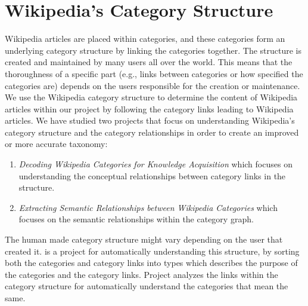 
\section{Wikipedia's Category Structure}
\label{sec:category_structure}
Wikipedia articles are placed within categories, and these categories form an underlying category structure by linking the categories together. The structure is created and maintained by many users all over the world. This means that the thoroughness of a specific part (e.g., links between categories or how specified the categories are) depends on the users responsible for the creation or maintenance. We use the Wikipedia category structure to determine the content of Wikipedia articles within our project by following the category links leading to Wikipedia articles. We have studied two projects that focus on understanding Wikipedia's category structure and the category relationships in order to create an improved or more accurate taxonomy: 


\begin{enumerate}
\item \emph{Decoding Wikipedia Categories for Knowledge Acquisition}  \cite{nastase2008decoding} which focuses on understanding the conceptual relationships between category links in the structure. 
\item \emph{Extracting Semantic Relationships between Wikipedia Categories} \cite{chernov2006extracting} which focuses on the semantic relationships within the category graph. 
\end{enumerate}





The human made category structure might vary depending on the user that created it. \cite{nastase2008decoding} is a project for automatically understanding this structure, by sorting both the categories and category links into types which describes the purpose of the categories and the category links. 
Project  \cite{chernov2006extracting} analyzes the links within the category structure for automatically understand the categories that mean the same. 



